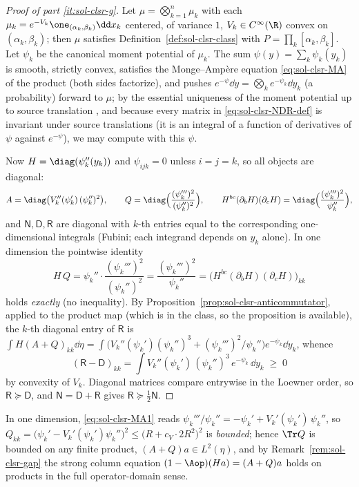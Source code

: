 \documentclass[../main.tex]{subfiles}
\begin{document}
\begin{proof}[Proof of part \ref{it:sol-clsr-g}]
Let $\mu=\bigotimes_{k=1}^n\mu_k$ with each $\mu_k=e^{-V_k}\one_{(\alpha_k,\beta_k)}\dd x_k$
centered, of variance $1$, $V_k\in C^\infty(\R)$ convex on $(\alpha_k,\beta_k)$; then $\mu$
satisfies Definition~\ref{def:sol-clsr-class} with $P=\prod_k[\alpha_k,\beta_k]$.  Let
$\psi_k$ be the canonical moment potential of $\mu_k$.  The sum
$\psi(y)=\sum_k\psi_k(y_k)$ is smooth, strictly convex, satisfies the Monge--Amp\`ere
equation \eqref{eq:sol-clsr-MA} of the product (both sides factorize), and pushes
$e^{-\psi}\dd y=\bigotimes_ke^{-\psi_k}\dd y_k$ (a probability) forward to $\mu$; by the
essential uniqueness of the moment potential up to source translation
\cite{CorderoErausquinKlartag2015MomentMeasures}, and because every matrix in
\eqref{eq:sol-clsr-NDR-def} is invariant under source translations (it is an integral of a
function of derivatives of $\psi$ against $e^{-\psi}$), we may compute with this $\psi$.

Now $H=\diag(\psi_k''(y_k))$ and $\psi_{ijk}=0$ unless $i=j=k$, so all objects are diagonal:
\[
  A=\diag\bigl(V_k''(\psi_k')\,(\psi_k'')^2\bigr),\qquad
  Q=\diag\Bigl(\frac{(\psi_k''')^2}{(\psi_k'')^2}\Bigr),\qquad
  H^{bc}(\partial_bH)(\partial_cH)=\diag\Bigl(\frac{(\psi_k''')^2}{\psi_k''}\Bigr),
\]
and $\mathsf N,\mathsf D,\mathsf R$ are diagonal with $k$-th entries equal to the
corresponding one-dimensional integrals (Fubini; each integrand depends on $y_k$ alone).
In one dimension the pointwise identity
\[
  H\,Q=\psi_k''\cdot\frac{(\psi_k''')^2}{(\psi_k'')^2}
  =\frac{(\psi_k''')^2}{\psi_k''}=\bigl(H^{bc}(\partial_bH)(\partial_cH)\bigr)_{kk}
\]
holds \emph{exactly} (no inequality).  By
Proposition~\ref{prop:sol-clsr-anticommutator}, applied to the product map (which is in the
class, so the proposition is available), the $k$-th diagonal entry of $\mathsf R$ is
$\int H(A+Q)_{kk}\dd\eta=\int\bigl(V_k''(\psi_k')(\psi_k'')^3+(\psi_k''')^2/\psi_k''\bigr)
e^{-\psi_k}\dd y_k$, whence
\[
  (\mathsf R-\mathsf D)_{kk}
  =\int V_k''(\psi_k')\,(\psi_k'')^3\,e^{-\psi_k}\,\dd y_k\;\ge\;0
\]
by convexity of $V_k$.  Diagonal matrices compare entrywise in the Loewner order, so
$\mathsf R\succeq\mathsf D$, and $\mathsf N=\mathsf D+\mathsf R$ gives
$\mathsf R\succeq\tfrac12\mathsf N$.
\end{proof}

\begin{remark}
\label{rem:sol-clsr-product-strong}
In one dimension, \eqref{eq:sol-clsr-MA1} reads
$\psi_k'''/\psi_k''=-\psi_k'+V_k'(\psi_k')\,\psi_k''$, so
$Q_{kk}=\bigl(\psi_k'-V_k'(\psi_k')\psi_k''\bigr)^2\le\bigl(R+c_V\cdot2R^2\bigr)^2$ is
\emph{bounded}; hence $\Tr Q$ is bounded on any finite product, $(A+Q)a\in L^2(\eta)$, and by
Remark~\ref{rem:sol-clsr-gap} the strong column equation $(1-\Aop)(Ha)=(A+Q)a$ holds on
products in the full operator-domain sense.
\end{remark}
\end{document}
